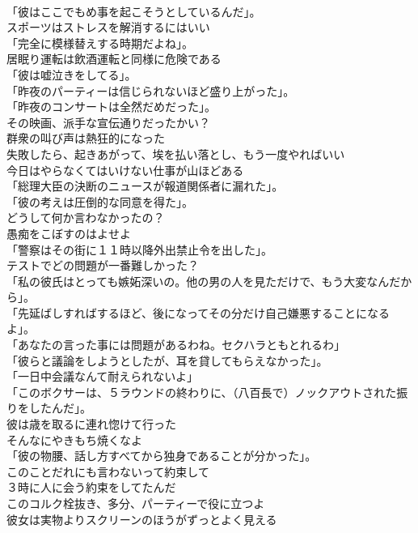 \documentclass[8pt]{extreport}
\begin{document}
\begin{CJK}{UTF8}{min}
\\	「彼はここでもめ事を起こそうとしているんだ」。	
\\	スポーツはストレスを解消するにはいい	
\\	「完全に模様替えする時期だよね」。	
\\	居眠り運転は飲酒運転と同様に危険である	
\\	「彼は嘘泣きをしてる」。	
\\	「昨夜のパーティーは信じられないほど盛り上がった」。	
\\	「昨夜のコンサートは全然だめだった」。	
\\	その映画、派手な宣伝通りだったかい？	
\\	群衆の叫び声は熱狂的になった	
\\	失敗したら、起きあがって、埃を払い落とし、もう一度やればいい	
\\	今日はやらなくてはいけない仕事が山ほどある	
\\	「総理大臣の決断のニュースが報道関係者に漏れた」。	
\\	「彼の考えは圧倒的な同意を得た」。	
\\	どうして何か言わなかったの？	
\\	愚痴をこぼすのはよせよ	
\\	「警察はその街に１１時以降外出禁止令を出した」。	
\\	テストでどの問題が一番難しかった？	
\\	「私の彼氏はとっても嫉妬深いの。他の男の人を見ただけで、もう大変なんだから」。	
\\	「先延ばしすればするほど、後になってその分だけ自己嫌悪することになるよ」。	
\\	「あなたの言った事には問題があるわね。セクハラともとれるわ」	
\\	「彼らと議論をしようとしたが、耳を貸してもらえなかった」。	
\\	「一日中会議なんて耐えられないよ」	
\\	「このボクサーは、５ラウンドの終わりに、（八百長で）ノックアウトされた振りをしたんだ」。	
\\	彼は歳を取るに連れ惚けて行った	
\\	そんなにやきもち焼くなよ	
\\	「彼の物腰、話し方すべてから独身であることが分かった」。	
\\	このことだれにも言わないって約束して	
\\	３時に人に会う約束をしてたんだ	
\\	このコルク栓抜き、多分、パーティーで役に立つよ	
\\	彼女は実物よりスクリーンのほうがずっとよく見える	

\end{CJK}
\end{document}
